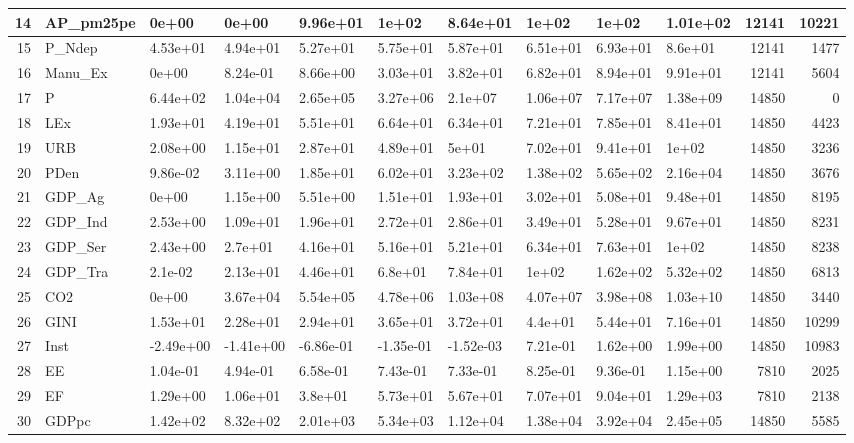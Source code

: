 \documentclass{article}\usepackage[]{graphicx}\usepackage[]{color}
\begin{document}
\begin{landscape}
\begin{longtable}[t]{r|l|l|l|l|l|l|l|l|l|r|r}
\hline
14 & AP\_pm25pe & 0e+00 & 0e+00 & 9.96e+01 & 1e+02 & 8.64e+01 & 1e+02 & 1e+02 & 1.01e+02 & 12141 & 10221\\
\hline
15 & P\_Ndep & 4.53e+01 & 4.94e+01 & 5.27e+01 & 5.75e+01 & 5.87e+01 & 6.51e+01 & 6.93e+01 & 8.6e+01 & 12141 & 1477\\
\hline
16 & Manu\_Ex & 0e+00 & 8.24e-01 & 8.66e+00 & 3.03e+01 & 3.82e+01 & 6.82e+01 & 8.94e+01 & 9.91e+01 & 12141 & 5604\\
\hline
17 & P & 6.44e+02 & 1.04e+04 & 2.65e+05 & 3.27e+06 & 2.1e+07 & 1.06e+07 & 7.17e+07 & 1.38e+09 & 14850 & 0\\
\hline
18 & LEx & 1.93e+01 & 4.19e+01 & 5.51e+01 & 6.64e+01 & 6.34e+01 & 7.21e+01 & 7.85e+01 & 8.41e+01 & 14850 & 4423\\
\hline
19 & URB & 2.08e+00 & 1.15e+01 & 2.87e+01 & 4.89e+01 & 5e+01 & 7.02e+01 & 9.41e+01 & 1e+02 & 14850 & 3236\\
\hline
20 & PDen & 9.86e-02 & 3.11e+00 & 1.85e+01 & 6.02e+01 & 3.23e+02 & 1.38e+02 & 5.65e+02 & 2.16e+04 & 14850 & 3676\\
\hline
21 & GDP\_Ag & 0e+00 & 1.15e+00 & 5.51e+00 & 1.51e+01 & 1.93e+01 & 3.02e+01 & 5.08e+01 & 9.48e+01 & 14850 & 8195\\
\hline
22 & GDP\_Ind & 2.53e+00 & 1.09e+01 & 1.96e+01 & 2.72e+01 & 2.86e+01 & 3.49e+01 & 5.28e+01 & 9.67e+01 & 14850 & 8231\\
\hline
23 & GDP\_Ser & 2.43e+00 & 2.7e+01 & 4.16e+01 & 5.16e+01 & 5.21e+01 & 6.34e+01 & 7.63e+01 & 1e+02 & 14850 & 8238\\
\hline
24 & GDP\_Tra & 2.1e-02 & 2.13e+01 & 4.46e+01 & 6.8e+01 & 7.84e+01 & 1e+02 & 1.62e+02 & 5.32e+02 & 14850 & 6813\\
\hline
25 & CO2 & 0e+00 & 3.67e+04 & 5.54e+05 & 4.78e+06 & 1.03e+08 & 4.07e+07 & 3.98e+08 & 1.03e+10 & 14850 & 3440\\
\hline
26 & GINI & 1.53e+01 & 2.28e+01 & 2.94e+01 & 3.65e+01 & 3.72e+01 & 4.4e+01 & 5.44e+01 & 7.16e+01 & 14850 & 10299\\
\hline
27 & Inst & -2.49e+00 & -1.41e+00 & -6.86e-01 & -1.35e-01 & -1.52e-03 & 7.21e-01 & 1.62e+00 & 1.99e+00 & 14850 & 10983\\
\hline
28 & EE & 1.04e-01 & 4.94e-01 & 6.58e-01 & 7.43e-01 & 7.33e-01 & 8.25e-01 & 9.36e-01 & 1.15e+00 & 7810 & 2025\\
\hline
29 & EF & 1.29e+00 & 1.06e+01 & 3.8e+01 & 5.73e+01 & 5.67e+01 & 7.07e+01 & 9.04e+01 & 1.29e+03 & 7810 & 2138\\
\hline
30 & GDPpc & 1.42e+02 & 8.32e+02 & 2.01e+03 & 5.34e+03 & 1.12e+04 & 1.38e+04 & 3.92e+04 & 2.45e+05 & 14850 & 5585\\

\end{longtable}
\end{landscape}
\end{document}

